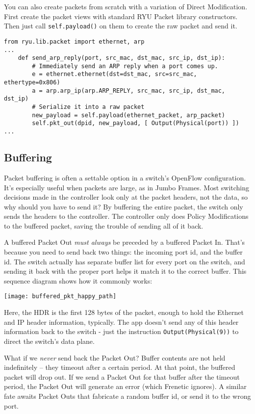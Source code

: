 You can also create packets from scratch with a variation of Direct Modification.  
First create the packet views with standard RYU Packet library constructors.
Then just call \texttt{self.payload()} on them to create the raw packet and send it.  

\begin{verbatim}
from ryu.lib.packet import ethernet, arp
...
    def send_arp_reply(port, src_mac, dst_mac, src_ip, dst_ip):
        # Immediately send an ARP reply when a port comes up.
        e = ethernet.ethernet(dst=dst_mac, src=src_mac, ethertype=0x806)
        a = arp.arp_ip(arp.ARP_REPLY, src_mac, src_ip, dst_mac, dst_ip)
	    # Serialize it into a raw packet
        new_payload = self.payload(ethernet_packet, arp_packet)
        self.pkt_out(dpid, new_payload, [ Output(Physical(port)) ])	
...
\end{verbatim}

\subsection{Buffering}

Packet buffering is often a settable option in a switch's OpenFlow configuration.  It's 
especially useful when packets are large, as in Jumbo Frames.  Most switching decisions made in 
the controller look only at the packet headers, not the data, so why should you have to send it?  By buffering the
entire packet, the switch only sends the headers to the controller.  The controller only does Policy Modifications
to the buffered packet, saving the trouble of sending all of it back.  

A buffered Packet Out \emph{must always} be preceded by a buffered Packet In.  That's because you need 
to send back two things:
the incoming port id, and the buffer id.  The switch actually has separate buffer list for every port on the switch, and 
sending it back with the proper port helps it match it to the correct buffer.   
This sequence diagram shows how it commonly works:

\texttt{[image: buffered\_pkt\_happy\_path]}

Here, the HDR is the first 128 bytes of the packet, enough to hold the Ethernet and IP header information,
typically.  The app doesn't send any of this header information back to the switch - just the instruction
\texttt{Output(Physical(9))} to direct the switch's data plane.

What if we \emph{never} send back the Packet Out?  Buffer contents are not held indefinitely -- they timeout after a 
certain period.  At that point, the buffered packet will drop out.
If we send a Packet Out for that buffer after the timeout period, the Packet Out will generate an error (which
Frenetic ignores).    A similar fate awaits Packet Outs that fabricate a random buffer id, or send it to the
wrong port.  


